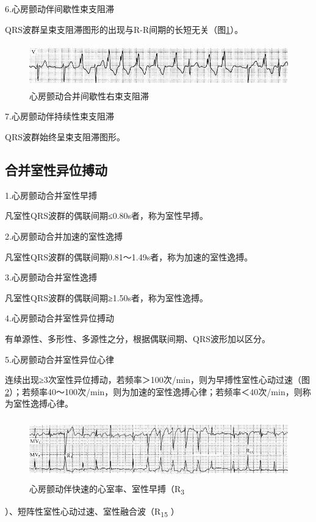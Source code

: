 6.心房颤动伴间歇性束支阻滞

QRS波群呈束支阻滞图形的出现与R-R间期的长短无关（图\ref{fig13-26}）。

\begin{figure}[!htbp]
 \centering
 \includegraphics[width=5.58333in,height=0.73958in]{./images/Image00234.jpg}
 \captionsetup{justification=centering}
 \caption{心房颤动合并间歇性右束支阻滞}
 \label{fig13-26}
  \end{figure} 

7.心房颤动伴持续性束支阻滞

QRS波群始终呈束支阻滞图形。

\protect\hypertarget{text00020.htmlux5cux23subid207}{}{}

\subsection{合并室性异位搏动}

1.心房颤动合并室性早搏

凡室性QRS波群的偶联间期≤0.80s者，称为室性早搏。

2.心房颤动合并加速的室性逸搏

凡室性QRS波群的偶联间期0.81～1.49s者，称为加速的室性逸搏。

3.心房颤动合并室性逸搏

凡室性QRS波群的偶联间期≥1.50s者，称为室性逸搏。

4.心房颤动合并室性异位搏动

有单源性、多形性、多源性之分，根据偶联间期、QRS波形加以区分。

5.心房颤动合并室性异位心律

连续出现≥3次室性异位搏动，若频率＞100次/min，则为早搏性室性心动过速（图\ref{fig13-27}）；若频率40～100次/min，则为加速的室性逸搏心律；若频率＜40次/min，则称为室性逸搏心律。

\begin{figure}[!htbp]
 \centering
 \includegraphics[width=5.58333in,height=1.0625in]{./images/Image00235.jpg}
 \captionsetup{justification=centering}
 \caption{心房颤动伴快速的心室率、室性早搏（R\textsubscript{3}}
 \label{fig13-27}
  \end{figure} 
）、短阵性室性心动过速、室性融合波（R\textsubscript{15} ）

